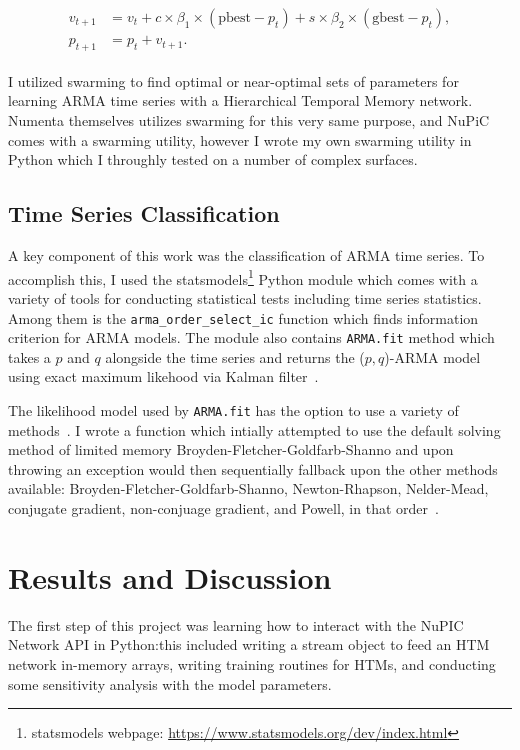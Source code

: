 \documentclass[oneside,12pt,openany]{book}
\begin{document}
	\begin{align}
	\label{eqn:psoupdate}
	\begin{split}
	v_{t+1} &= v_{t}+c\times \beta_{1} \times (\text{pbest}-p_{t})+s\times \beta_{2} \times (\text{gbest}-p_{t}), \\
	p_{t+1} &= p_{t} + v_{t+1} .
	\end{split}
	\end{align}

	I utilized swarming to find optimal or near-optimal sets of parameters for learning ARMA time series with a Hierarchical Temporal Memory network. Numenta themselves utilizes swarming for this very same purpose, and NuPiC comes with a swarming utility, however I wrote my own swarming utility in Python which I throughly tested on a number of complex surfaces.
	
	\section{Time Series Classification}

	A key component of this work was the classification of ARMA time series. To accomplish this, I used the statsmodels\footnote{statsmodels webpage: \href{https://www.statsmodels.org/dev/index.html}{https://www.statsmodels.org/dev/index.html}} Python module which comes with a variety of tools for conducting statistical tests including time series statistics. Among them is the \texttt{arma\_order\_select\_ic} function which finds information criterion for ARMA models. The module also contains \texttt{ARMA.fit} method which takes a $p$ and $q$ alongside the time series and returns the ($p,q$)-ARMA model using exact maximum likehood via Kalman filter~\cite{statsmodels}.

	The likelihood model used by \texttt{ARMA.fit} has the option to use a variety of methods~\cite{statsmodels}. I wrote a function which intially attempted to use the default solving method of limited memory Broyden-Fletcher-Goldfarb-Shanno and upon throwing an exception would then sequentially fallback upon the other methods available: Broyden-Fletcher-Goldfarb-Shanno, Newton-Rhapson, Nelder-Mead, conjugate gradient, non-conjuage gradient, and Powell, in that order~\cite{statsmodels}.
	
	\chapter{Results and Discussion}

	The first step of this project was learning how to interact with the NuPIC Network API in Python:this included writing a stream object to feed an HTM network in-memory arrays, writing training routines for HTMs, and conducting some sensitivity analysis with the model parameters. 
	
\end{document}
